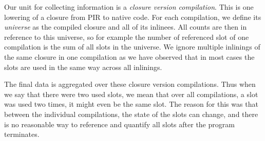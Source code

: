 Our unit for collecting information is a \textit{closure version compilation}. This is one lowering of a closure from PIR to native code. For each compilation, we define its \textit{universe} as the compiled closure and all of its inlinees. All counts are then in reference to this universe, so for example the number of referenced slot of one compilation is the sum of all slots in the universe. We ignore multiple inlinings of the same closure in one compilation as we have observed that in most cases the slots are used in the same way across all inlinings.

The final data is aggregated over these closure version compilations. Thus when we say that there were two used slots, we mean that over all compilations, a slot was used two times, it might even be the same slot. The reason for this was that between the individual compilations, the state of the slots can change, and there is no reasonable way to reference and quantify all slots after the program terminates.

